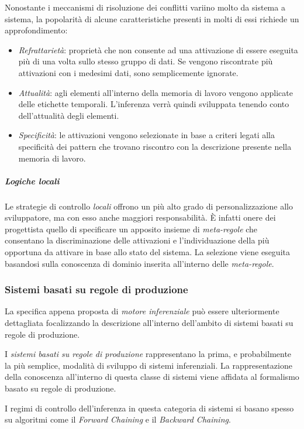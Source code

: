 Nonostante i meccanismi di risoluzione dei conflitti variino molto da sistema a sistema, la popolarità di alcune caratteristiche presenti in molti di essi richiede un approfondimento:

\begin{itemize}
	\item \emph{Refrattarietà}: proprietà che non consente ad una attivazione di essere eseguita più di una volta sullo stesso gruppo di dati. Se vengono riscontrate più attivazioni con i medesimi dati, sono semplicemente ignorate.
	\item \emph{Attualità}: agli elementi all'interno della memoria di lavoro vengono applicate delle etichette temporali. L'inferenza verrà quindi sviluppata tenendo conto dell'attualità degli elementi.
	\item \emph{Specificità}: le attivazioni vengono selezionate in base a criteri legati alla specificità dei pattern che trovano riscontro con la descrizione presente nella memoria di lavoro.
\end{itemize}

\subparagraph{Logiche locali} Le strategie di controllo \emph{locali} offrono un più alto grado di personalizzazione allo sviluppatore, ma con esso anche maggiori responsabilità. \`E infatti onere dei progettista quello di specificare un apposito insieme di \emph{meta-regole} che consentano la discriminazione delle attivazioni e l'individuazione della più opportuna da attivare in base allo stato del sistema. La selezione viene eseguita basandosi sulla conoscenza di dominio inserita all'interno delle \emph{meta-regole}.

\subsubsection{Sistemi basati su regole di produzione}

La specifica appena proposta di \emph{motore inferenziale} può essere ulteriormente dettagliata focalizzando la descrizione all'interno dell'ambito di sistemi basati su regole di produzione.

I \emph{sistemi basati su regole di produzione} rappresentano la prima, e probabilmente la più semplice, modalità di sviluppo di sistemi inferenziali. La rappresentazione della conoscenza all'interno di questa classe di sistemi viene affidata al formalismo basato su regole di produzione.

I regimi di controllo dell'inferenza in questa categoria di sistemi si basano spesso su algoritmi come il \emph{Forward Chaining} e il \emph{Backward Chaining}.


